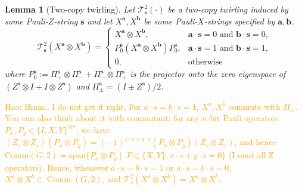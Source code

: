\documentclass[a4paper,onecolumn,notitlepage,nofootinbib,longbibliography,superscriptaddress, floatfix, pra, aps, 10pt]{revtex4-2}
\newcommand{\vta}{{\bm{a}}}
\newcommand{\vtb}{{\bm{b}}}
\newcommand{\vts}{{\bm{s}}}
\newtheorem{lemma}{Lemma}
\newcommand\hw[1]{\textcolor{orange}{Hao: #1}}
\begin{document}
\begin{lemma}[Two-copy twirling] \label{lem: two_copy_twirl}
Let $\mathcal{T}^2_\vts(\cdot)$ be a two-copy twirling induced by some Pauli-$Z$-string $\vts$ and let $X^\vta, X^\vtb$ be some Pauli-$X$-strings specified by $\vta, \vtb$. 
    \begin{equation}
      \mathcal{T}^2_\vts(X^\vta \otimes X^\vtb) = \begin{cases} X^\vta \otimes X^\vtb, & \vta \cdot \vts = 0 \text{ and } \vtb \cdot \vts = 0,\\
      P_0^{\vts} \left(X^\vta \otimes X^\vtb \right) P_0^{\vts}, & \vta \cdot \vts = 1 \text{ and } \vtb \cdot \vts = 1 , \\
           0, &\text{otherwise}
      \end{cases}
    \end{equation}
where $
  P_0^{\vts} := \Pi_+^{\vts}\otimes\Pi_-^{\vts} + \Pi_-^{\vts}\otimes\Pi_+^{\vts}
$
is the projector onto the zero eigenspace of $(Z^{\vts} \otimes I + I\otimes Z^{\vts})
$ and $\Pi_\pm^{\vts} = (I\pm Z^{\vts}) /2$.
\end{lemma}
\hw{Hmm.. I do not get it right. For $a\cdot s=b\cdot s=1$, $X^a, X^b$ commute with $\Pi_{\pm}$. You can also think about it with commutant: for any $n$-bit Pauli operators $P_x, P_y\in\{I, X, Y\}^{\otimes n}$, we have $(Z_s\otimes Z_s)(P_x\otimes P_y)=(-1)^{x\cdot s + y\cdot s}(P_x\otimes P_y)(Z_s\otimes Z_s)$, and hence $\mathrm{Comm}(G,2)=\mathrm{span}\{P_x\otimes P_y \;\vert\;\;P\in\{X,Y\}, x\cdot s + y\cdot s = 0\}$ (I omit all Z operators). Hence, whenever $a\cdot s = b\cdot s=1$ or $a\cdot s = b\cdot s =0$, $X^a\otimes X^b\in\operatorname{Comm}(G,2)$, and $\mathcal{T}^2_s(X^a\otimes X^b) = X^a\otimes X^b$.} 
\end{document}

